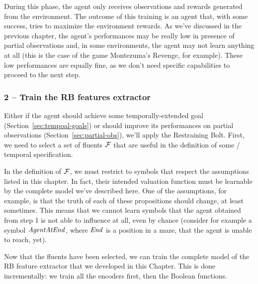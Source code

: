 During this phase, the agent only receives observations and rewards generated
from the environment. The outcome of this training is an agent that, with some
success, tries to maximize the environment rewards. As we've discussed in the
previous chapter, the agent's performances may be really low in presence of
partial observations and, in some environments, the agent may not learn
anything at all (this is the case of the game Montezuma's Revenge, for
example). These low performances are equally fine, as we don't need specific
capabilities to proceed to the next step.


\subsubsection*{2 -- Train the RB features extractor}

Either if the agent should achieve some temporally-extended goal
(Section~\ref{sec:tempoal-goals}) or should improve its performances on
partial observations (Section~\ref{sec:partial-obs}), we'll apply the
Restraining Bolt. First, we need to select a set of fluents $\mathcal{F}$ that
are useful in the definition of some \ltl{}/\ldl{} temporal specification.

In the definition of $\mathcal{F}$, we must restrict to symbols that respect the
assumptions listed in this chapter. In fact, their intended valuation function
must be learnable by the complete model we've described here. One of the
assumptions, for example, is that the truth of each of these propositions
should change, at least sometimes. This means that we cannot learn symbols
that the agent obtained from step 1 is not able to influence at all, even by
chance (consider for example a symbol $\text{\textit{AgentAtEnd}}$, where
$\text{\textit{End}}$ is a position in a maze, that the agent is unable to reach,
yet).

Now that the fluents have been selected, we can train the complete model of
the RB feature extractor that we developed in this Chapter. This is done
incrementally: we train all the encoders first, then the Boolean functions.

